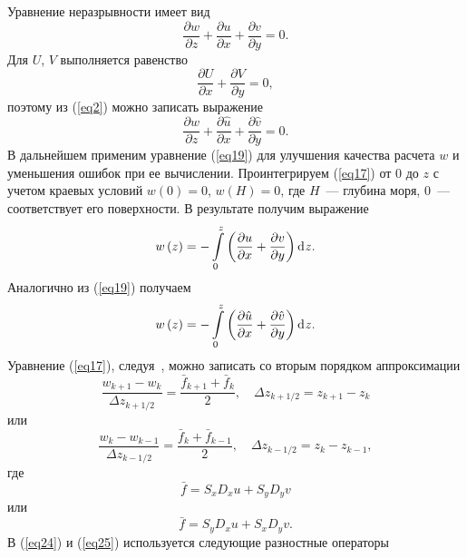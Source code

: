 \documentclass[press]{vestnik}
\begin{document}
Уравнение неразрывности имеет вид
\begin{equation}
\label{eq17}
\frac{\partial w}{\partial z}+\frac{\partial u}{\partial x}+\frac{\partial 
v}{\partial y}=0.
\end{equation}
Для $U$, $V$ выполняется равенство
\begin{equation}
\label{eq18}
\frac{\partial U}{\partial x}+\frac{\partial V}{\partial y}=0,
\end{equation}
поэтому из (\ref{eq2}) можно записать выражение
\begin{equation}
\label{eq19}
\frac{\partial w}{\partial z}+\frac{\partial \hat{{u}}}{\partial 
x}+\frac{\partial \hat{{v}}}{\partial y}=0.
\end{equation}
В дальнейшем применим уравнение (\ref{eq19}) для улучшения качества расчета $w$ и 
уменьшения ошибок при ее вычислении. Проинтегрируем (\ref{eq17}) от 0 до $z$ с 
учетом краевых условий $w\left( 0 \right)=0$, $w\left( H \right)=0$, где 
$H$~--- глубина моря, 0~--- соответствует его поверхности. В результате получим 
выражение
\begin{equation}
\label{eq20}
w\left( z \right)=-\int\limits_0^z \left( {\frac{\partial u}{\partial 
x}+\frac{\partial v}{\partial y}} \right)\d z .
\end{equation}
Аналогично из (\ref{eq19}) получаем
\begin{equation}
\label{eq21}
w\left( z \right)=-\int\limits_0^z \left( {\frac{\partial 
\hat{{u}}}{\partial x}+\frac{\partial \hat{{v}}}{\partial y}} \right)\d z.
\end{equation}
Уравнение (\ref{eq17}), следуя~\cite{B02}, можно записать со вторым порядком аппроксимации
\begin{equation}
\label{eq22}
\frac{w_{k+1} -w_{k} }{\Delta z_{k+1/2} }=\frac{\bar f_{k+1} + \bar f_{k} }{2},
\quad
\Delta z_{k+1/2} =z_{k+1} -z_{k} 
\end{equation}
или
\begin{equation}
\label{eq23}
\frac{w_{k} -w_{k-1} }{\Delta z_{k-1/2} }=\frac{\bar f_{k} + \bar f_{k-1} }{2},
\quad
\Delta z_{k-1/2} =z_{k} -z_{k-1} ,
\end{equation}
где
\begin{equation}
\label{eq24}
\bar f=S_{x} D_{x} u+S_{y} D_{y} v
\end{equation}
или 
\begin{equation}
\label{eq25}
\bar f=S_{y} D_{x} u+S_{x} D_{y} v.
\end{equation}
В (\ref{eq24}) и (\ref{eq25}) используется следующие разностные операторы
\end{document}
